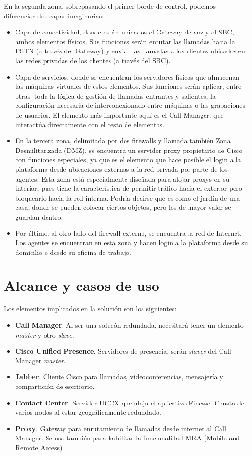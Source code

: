 \documentclass[a4paper, 12pt]{book}
\begin{document}
En la segunda zona, sobrepasando el primer borde de control, podemos diferenciar dos capas imaginarias:
\begin{itemize}
  \item Capa de conectividad, donde están ubicados el Gateway de voz y el SBC, ambos elementos físicos. Sus funciones serán enrutar las llamadas hacia la PSTN (a través del Gateway) y enviar las llamadas a los clientes ubicados en las redes privadas de los clientes (a través del SBC).
  \item Capa de servicios, donde se encuentran los servidores físicos que almacenan las máquinas virtuales de estos elementos. Sus funciones serán aplicar, entre otras, toda la lógica de gestión de llamadas entrantes y salientes, la configuración necesaria de interconexionado entre máquinas o las grabaciones de usuarios. El elemento más importante aquí es el Call Manager, que interactúa directamente con el resto de elementos.
  \item En la tercera zona, delimitada por dos firewalls y llamada también Zona Desmilitarizada (DMZ), se encuentra un servidor proxy propietario de Cisco con funciones especiales, ya que es el elemento que hace posible el login a la plataforma desde ubicaciones externas a la red privada por parte de los agentes. Esta zona está especialmente diseñada para alojar proxys en su interior, pues tiene la característica de permitir tráfico hacia el exterior pero bloquearlo hacia la red interna. Podría decirse que es como el jardín de una casa, donde se pueden colocar ciertos objetos, pero los de mayor valor se guardan dentro.
  \item Por último, al otro lado del firewall externo, se encuentra la red de Internet. Los agentes se encuentran en esta zona y hacen login a la plataforma desde su domicilio o desde su oficina de trabajo.
\end{itemize}

\section{Alcance y casos de uso}
\label{sec:alcance}
Los elementos implicados en la solución son los siguientes:
\begin{itemize}
  \item \textbf{Call Manager}. Al ser una solucón redundada, necesitará tener un elemento \emph{master} y otro \emph{slave}.
  \item \textbf{Cisco Unified Presence}. Servidores de presencia, serán \emph{slaves} del Call Manager \emph{master}.
  \item \textbf{Jabber}. Cliente Cisco para llamadas, videoconferencias, mensajería y compartición de escritorio.
  \item \textbf{Contact Center}. Servidor UCCX que aloja el aplicativo Finesse. Consta de varios nodos al estar geográficamente redundado.
  \item \textbf{Proxy}. Gateway para enrutamiento de llamadas desde internet al Call Manager. Se usa también para habilitar la funcionalidad MRA (Mobile and Remote Access).
\end{itemize}
\end{document}
